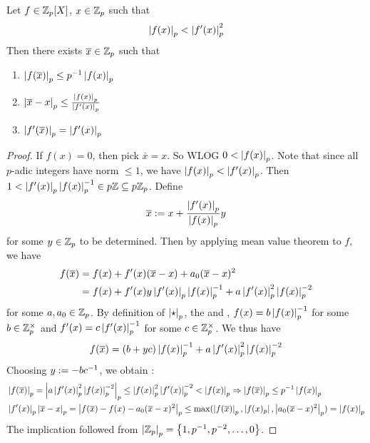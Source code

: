 \begin{prop}
  
  Let $f \in \mathbb{Z}_p[X]$, $x \in \mathbb{Z}_p$ such that 
  \[
    \left\vert f(x) \right\vert_p < \left\vert f'(x) \right\vert_p^2
  \]
  Then there exists $\overline{x} \in \mathbb{Z}_p$ such that 
  \begin{enumerate}
    \item $\left\vert f(\overline{x}) \right\vert_p \leq p^{-1}\left\vert f(x) \right\vert_p$
    \item $\left\vert \overline{x} - x \right\vert_p \leq \frac{\left\vert f(x) \right\vert_p}{\left\vert f'(x) \right\vert_p}$
    \item $\left\vert f'(\overline{x}) \right\vert_p = \left\vert f'(x) \right\vert_p$
  \end{enumerate}
\end{prop}
\begin{proof}
  If $f(x) = 0$, then pick $\bar{x} = x$. 
  So WLOG $0 < \left\vert f(x) \right\vert_p$. 
  Note that since all $p$-adic integers have 
  norm $\leq 1$, we have $\left\vert f(x) \right\vert_p < \left\vert f'(x) \right\vert_p$. 
  Then $1 < \left\vert f'(x) \right\vert_p \left\vert f(x) \right\vert_p^{-1} \in p\mathbb{Z} \subseteq p\mathbb{Z}_p$. 
  Define \[
    \overline{x} := x + \frac{\left\vert f'(x) \right\vert_p}{\left\vert f(x) \right\vert_p} y
  \]
  for some $y \in \mathbb{Z}_p$ to be determined. 
  Then by applying mean value theorem to $f$, we have \begin{align*}
    f(\overline{x}) 
    &= f(x) + f'(x)(\overline{x} - x) + a_0 (\overline{x} - x)^2 \\
    &= f(x) + f'(x) y \left\vert f'(x) \right\vert_p \left\vert f(x) \right\vert_p^{-1}
    + a \left\vert f'(x) \right\vert_p^2 \left\vert f(x) \right\vert_p^{-2}
  \end{align*}
  for some $a, a_0 \in \mathbb{Z}_p$.
  By definition of $\left\vert \star \right\vert_p$, 
  the  and 
  , 
  $f(x) = b \left\vert f(x) \right\vert_p^{-1}$ for some $b \in \mathbb{Z}_p^\times$
  and $f'(x) = c \left\vert f'(x) \right\vert_p^{-1}$ for some $c \in \mathbb{Z}_p^\times$.
  We thus have \[
    f(\overline{x}) = \left(b + y c\right)\left\vert f(x) \right\vert_p^{-1} 
    + a \left\vert f'(x) \right\vert_p^2 \left\vert f(x) \right\vert_p^{-2}
  \]
  Choosing $y := -bc^{-1}$, we obtain : 
  \begin{align*}
    &\left\vert f(\overline{x}) \right\vert_p = \left\vert a \left\vert f'(x) \right\vert_p^2 \left\vert f(x) \right\vert_p^{-2} \right\vert_p
    \leq \left\vert f(x) \right\vert_p^2 \left\vert f'(x) \right\vert_p^{-2} < \left\vert f(x) \right\vert_p 
    \Rightarrow \left\vert f(\overline{x}) \right\vert_p \leq p^{-1} \left\vert f(x) \right\vert_p \\
    &\left\vert f'(x) \right\vert_p \left\vert \overline{x} - x \right\vert_p
    = \left\vert f(\overline{x}) - f(x) - a_0 (\overline{x}-x)^2 \right\vert_p
    \leq \max(\left\vert f(\overline{x}) \right\vert_p,\left\vert f(x)_p \right\vert,\left\vert a_0 (\overline{x}-x)^2 \right\vert_p)
    = \left\vert f(x) \right\vert_p 
  \end{align*}
  The implication followed from 
  $\left\vert \mathbb{Z}_p \right\vert_p = \left\{1, p^{-1}, p^{-2}, \dots, 0\right\}$.

\end{proof}
